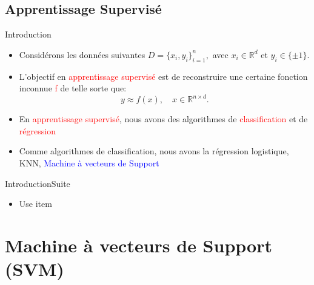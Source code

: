 \documentclass[10pt]{beamer}
\begin{document}
\subsection*{Apprentissage Supervis\'e}
{
\begin{frame}{Introduction} %
\begin{itemize}
\item Consid\'erons les donn\'ees suivantes $D = \{x_{i},y_{i}\}^{n}_{i=1},$ avec $x_{i} \in \mathbb{R}^{d}$ et $y_{i} \in \{ \pm 1\} $. 
\item L'objectif en \textcolor{red}{apprentissage supervis\'e} est de reconstruire une certaine fonction  inconnue \textcolor{red}{f} de telle sorte que: 
\textcolor{green!10!blue}{	
\begin{equation}
y \approx f(x), \quad x\in \mathbb{R}^{n\times d}.
\end{equation}}
\pause
 \item En \textcolor{red}{apprentissage supervis\'e}, nous avons des algorithmes de \textcolor{red}{classification} et de \textcolor{red}{r\'egression}
 \item Comme algorithmes de classification, nous avons la r\'egression logistique, KNN, \textcolor{blue}{Machine \`a vecteurs de Support}
 \end{itemize}
 \end{frame}}
{
\begin{frame}{Introduction}{Suite}
 \begin{itemize}
\item Use item
\end{itemize}
\end{frame}}
\section{Machine \`a vecteurs de Support (SVM)}
\end{document}
